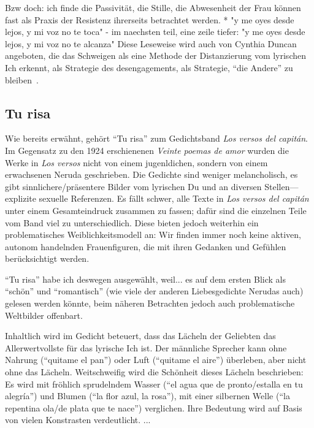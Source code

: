 Bzw doch: ich finde die Passivität, die Stille, die Abwesenheit der Frau können fast als Praxis der Resistenz ihrerseits betrachtet werden.
  * "y me oyes desde lejos, y mi voz no te toca" - im naechsten teil, eine zeile tiefer: "y me oyes desde lejos, y mi voz no te alcanza"
Diese Leseweise wird auch von Cynthia Duncan angeboten, die das Schweigen als eine Methode der Distanzierung vom lyrischen Ich erkennt, als Strategie des desengagements, als Strategie, ``die Andere'' zu bleiben~\cite{Duncan1992}.

\begin{comment}
  * 4 x 4Line verse: Quartette (lookup wie das korrekt heißt auf Deutsch!) + 2 x 2Zeiler (Couplets) --> erinnert ein bisschen an Sonnetform aber nicht ganz (Wie heißen nochma die verschiedene Sonnetformen? Nicht die von Gongora sondern die von Shakespeare meine ich grad: 3x4Zeilen und dann 2)
\end{comment}

\subsection{Tu risa}

Wie bereits erwähnt, gehört ``Tu risa'' zum Gedichtsband \textit{Los versos del capitán}.
Im Gegensatz zu den 1924 erschienenen \textit{Veinte poemas de amor} wurden die Werke in \textit{Los versos} nicht von einem jugenldichen, sondern von einem erwachsenen Neruda geschrieben.
Die Gedichte sind weniger melancholisch, es gibt sinnlichere/präsentere Bilder vom lyrischen Du und an diversen Stellen—explizite sexuelle Referenzen.
Es fällt schwer, alle Texte in \textit{Los versos del capitán} unter einem Gesamteindruck zusammen zu fassen;
dafür sind die einzelnen Teile vom Band viel zu unterschiedlich.
Diese bieten jedoch weiterhin ein problematisches Weiblichkeitsmodell an:
Wir finden immer noch keine aktiven, autonom handelnden Frauenfiguren, die mit ihren Gedanken und Gefühlen berücksichtigt werden.

``Tu risa'' habe ich deswegen ausgewählt, weil...
es auf dem ersten Blick als ``schön'' und ``romantisch'' (wie viele der anderen Liebesgedichte Nerudas auch) gelesen werden könnte, %
beim näheren Betrachten jedoch auch problematische Weltbilder offenbart.

Inhaltlich wird im Gedicht beteuert, dass das Lächeln der Geliebten das Allerwertvollste für das lyrische Ich ist.
Der männliche Sprecher kann ohne Nahrung (``quitame el pan'') oder Luft (``quitame el aire'') überleben, aber nicht ohne das Lächeln.
Weitschweifig wird die Schönheit dieses Lächeln beschrieben:
Es wird mit fröhlich sprudelndem Wasser (``el agua que de pronto/estalla en tu alegría'') und Blumen (``la flor azul, la rosa''), mit einer silbernen Welle (``la repentina ola/de plata que te nace'') verglichen.
Ihre Bedeutung wird auf Basis von vielen Konstrasten verdeutlicht. %
...

